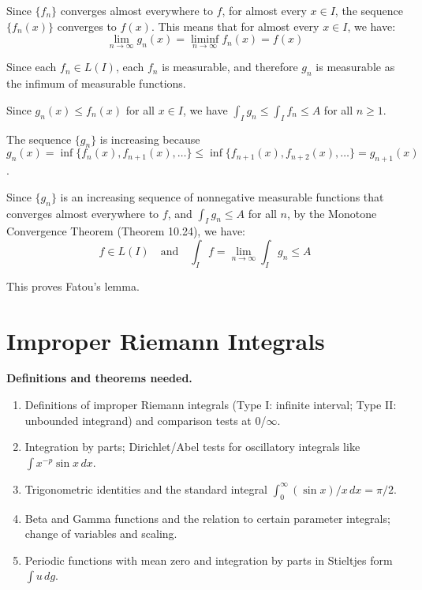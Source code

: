 Since $\{f_n\}$ converges almost everywhere to $f$, for almost every $x \in I$, the sequence $\{f_n(x)\}$ converges to $f(x)$. This means that for almost every $x \in I$, we have:
\[\lim_{n \to \infty} g_n(x) = \liminf_{n \to \infty} f_n(x) = f(x)\]

Since each $f_n \in L(I)$, each $f_n$ is measurable, and therefore $g_n$ is measurable as the infimum of measurable functions.

Since $g_n(x) \leq f_n(x)$ for all $x \in I$, we have $\int_I g_n \leq \int_I f_n \leq A$ for all $n \geq 1$.

The sequence $\{g_n\}$ is increasing because $g_n(x) = \inf \{f_n(x), f_{n+1}(x), \ldots\} \leq \inf \{f_{n+1}(x), f_{n+2}(x), \ldots\} = g_{n+1}(x)$.

Since $\{g_n\}$ is an increasing sequence of nonnegative measurable functions that converges almost everywhere to $f$, and $\int_I g_n \leq A$ for all $n$, by the Monotone Convergence Theorem (Theorem 10.24), we have:
\[f \in L(I) \quad \text{and} \quad \int_I f = \lim_{n \to \infty} \int_I g_n \leq A\]

This proves Fatou's lemma.

\section{Improper Riemann Integrals}

\noindent\textbf{Definitions and theorems needed.}
\begin{enumerate}[label=(\alph*)]
    \item Definitions of improper Riemann integrals (Type I: infinite interval; Type II: unbounded integrand) and comparison tests at $0$/$\infty$.
    \item Integration by parts; Dirichlet/Abel tests for oscillatory integrals like $\int x^{-p}\sin x\,dx$.
    \item Trigonometric identities and the standard integral $\int_0^{\infty} (\sin x)/x\,dx=\pi/2$.
    \item Beta and Gamma functions and the relation to certain parameter integrals; change of variables and scaling.
    \item Periodic functions with mean zero and integration by parts in Stieltjes form $\int u\,dg$.
\end{enumerate}

